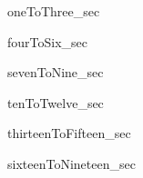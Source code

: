 
{oneToThree_sec}

{fourToSix_sec}

{sevenToNine_sec}

{tenToTwelve_sec}

{thirteenToFifteen_sec}

{sixteenToNineteen_sec}